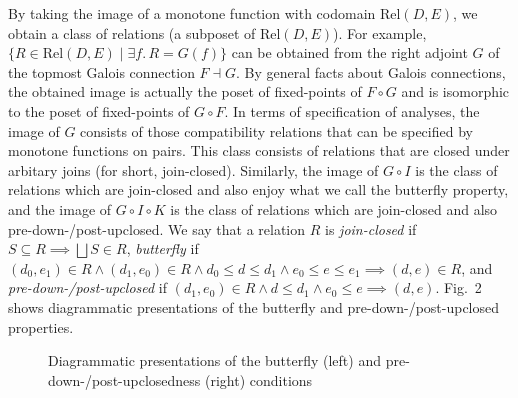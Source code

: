 \documentclass{easychair}
\theoremstyle{definition}
\newcommand{\Rel}{\mathrm{Rel}}
\newcommand{\bigjoin}{\bigsqcup}
\newcommand{\comp}{\circ}
\newcommand{\rotleq}{\rotatebox[origin=c]{90}{$\leq$}}
\begin{document}
By taking the image of a monotone function with codomain $\Rel(D, E)$,
we obtain a class of relations (a subposet of $\Rel(D, E)$). For
example, $\{ R \in \Rel(D, E) \mid \exists f.\, R = G(f) \}$ can be obtained from the right adjoint $G$
of the topmost Galois connection $F \dashv G$. By general
facts about Galois connections, the obtained image is actually the poset of 
fixed-points of $F \comp G$ and is isomorphic to the poset of
fixed-points of $G \comp F$. In terms of specification of analyses, the image
of $G$ consists of those compatibility relations that can be specified by monotone functions on pairs. This class consists of relations that are closed under arbitary joins (for short, join-closed).
Similarly, the image of $G \comp I$ is the class of relations which are join-closed and also enjoy what we call the butterfly property, and the image of $G \comp I \comp K$ is the class of relations which are join-closed and also pre-down-/post-upclosed. We say that a relation $R$ is \emph{join-closed} if $S \subseteq R \implies \bigjoin S \in R$, \emph{butterfly} if $(d_{0}, e_{1}) \in R \land (d_{1}, e_{0}) \in R \land d_{0} \leq d \leq d_{1} \land e_{0} \leq e \leq e_{1} \implies (d , e) \in R$, and \emph{pre-down-/post-upclosed} if $(d_{1}, e_{0}) \in R \land d \leq d_{1} \land e_{0} \leq e \implies (d , e)$. Fig.~2 shows diagrammatic presentations of the butterfly and pre-down-/post-upclosed properties.

\begin{figure}[h]
  \centering
  \label{fig:butterfly}
  \caption{Diagrammatic presentations of the butterfly (left) and pre-down-/post-upclosedness (right) conditions}
\end{figure}
\end{document}
